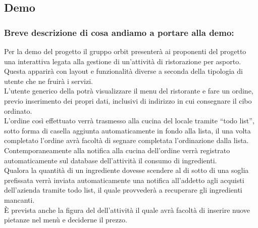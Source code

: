 \subsection{Demo}

\subsubsection{Breve descrizione di cosa andiamo a portare alla demo:}
Per la demo del progetto il gruppo orbit presenterà ai proponenti del progetto una  interattiva legata alla gestione di un'attività di ristorazione per asporto.
\\Questa {} apparirà con layout e funzionalità diverse a seconda della tipologia di utente che ne fruirà i servizi.
\\L'utente generico della  potrà visualizzare il menu del ristorante e fare un ordine, previo inserimento dei propri dati, inclusivi di indirizzo in cui consegnare il cibo ordinato.
\\L'ordine così effettuato verrà trasmesso alla cucina del locale tramite  “todo list”, sotto forma di casella aggiunta automaticamente in fondo alla lista, il  una volta completato l'ordine avrà facoltà di segnare completata l'ordinazione dalla lista.
\\Contemporaneamente alla notifica alla cucina dell'ordine verrà registrato automaticamente sul database dell'attività il consumo di ingredienti.
\\Qualora la quantità di un ingrediente dovesse scendere al di sotto di una soglia prefissata verrà inviata automaticamente una notifica all'addetto agli acquisti dell'azienda tramite todo list, il quale provvederà a recuperare gli ingredienti mancanti.
\\È prevista anche la figura del  dell'attività il quale avrà facoltà di inserire nuove pietanze nel menù e deciderne il prezzo.

